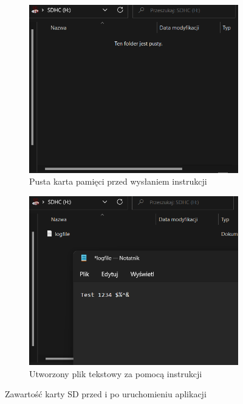 \documentclass[11pt, a4paper]{article}
\begin{document}
\begin{figure}[h!]
\centering
\begin{subfigure}{.5\textwidth}
  \centering
  \includegraphics[width=1\linewidth]{fig/KY-018/działanie_ukladu/przed.png}
  \caption{Pusta karta pamięci przed wysłaniem instrukcji}
  \label{fig:sub1}
\end{subfigure}%
\begin{subfigure}{.5\textwidth}
  \centering
  \includegraphics[width=1\linewidth]{fig/KY-018/działanie_ukladu/po.png}
  \caption{Utworzony plik tekstowy za pomocą instrukcji}
  \label{fig:sub2}
\end{subfigure}
\caption{Zawartość karty SD przed i po uruchomieniu aplikacji}
\label{fig:test}
\end{figure}
\newpage
\printbibliography[heading=bibintoc]
\end{document}
